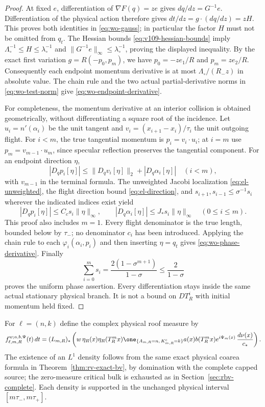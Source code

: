 \begin{proof}
At fixed $e$, differentiation of $\nabla F(q)=ze$ gives
$dq/dz=G^{-1}e$.  Differentiation of the physical action therefore
gives $dt/dz=g\cdot(dq/dz)=zH$.  This proves both identities in
\eqref{eq:wo-gauss}; in particular the factor $H$ must not be
omitted from $q_t$.  The Hessian bounds
\eqref{eq:v109-hessian-bounds} imply
$\Lambda_\circ^{-1}\le H\le\lambda_\circ^{-1}$ and
$\|G^{-1}e\|_\infty\le\lambda_\circ^{-1}$, proving the displayed
inequality.  By the exact first variation
$g=R(-p_0,p_m)$, we have $p_0=-ze_1/R$ and $p_m=ze_2/R$.
Consequently each endpoint momentum derivative is at most
$\Lambda_\circ/(R_-z)$ in absolute value.  The chain rule and the
two actual partial-derivative norms in \eqref{eq:wo-test-norm}
give \eqref{eq:wo-endpoint-derivative}.

For completeness, the momentum derivative at an interior collision
is obtained geometrically, without differentiating a square root
of the incidence.  Let $u_i=n'(\alpha_i)$ be the unit tangent and
$v_i=(x_{i+1}-x_i)/\tau_i$ the unit outgoing flight.  For $i<m$,
the true tangential momentum is $p_i=v_i\cdot u_i$; at $i=m$
use $p_m=v_{m-1}\cdot u_m$, since specular reflection preserves
the tangential component.  For an endpoint direction $\eta$,
\[
 |D_qp_i[\eta]|
 \le \|D_qv_i[\eta]\|_2+|D_q\alpha_i[\eta]|
 \quad(i<m),
\]
with $v_{m-1}$ in the terminal formula.  The unweighted Jacobi
localization \eqref{eq:el-unweighted}, the flight direction bound
\eqref{eq:el-direction}, and
$s_{i+1},s_{i-1}\le\sigma^{-1}s_i$ wherever the indicated
indices exist yield
\begin{equation}\label{eq:wo-interior-momentum}
 |D_qp_i[\eta]|\le C_c s_i\|\eta\|_\infty,
 \qquad |D_q\alpha_i[\eta]|\le J_*s_i\|\eta\|_\infty
 \quad(0\le i\le m).
\end{equation}
This proof also includes $m=1$.  Every flight denominator is the
true length, bounded below by $\tau_-$; no denominator $c_i$
has been introduced.  Applying the chain rule to each
$\varphi_i(\alpha_i,p_i)$ and then inserting $\eta=q_t$ gives
\eqref{eq:wo-phase-derivative}.  Finally
\[
 \sum_{i=0}^m s_i
 =\frac{2(1-\sigma^{m+1})}{1-\sigma}
 \le\frac2{1-\sigma}
\]
proves the uniform phase assertion.  Every differentiation stays
inside the same actual stationary physical branch.  It is not a
bound on $D T_R^i$ with initial momentum held fixed.
\end{proof}

For $\ell=(n,k)$ define the complex physical roof measure by
\begin{equation}\label{eq:wo-measures}
 f^{w;a,b,\Psi}_{\ell,m,R}(t)\,dt
 =(L_{m,R})_*\left(
 w\,\eta_R(x)\eta_R(T_R^mx)
 \one_{\{A_{m,R}=n,\,K^{\rm c}_{m,R}=k\}}
 a(x)b(T_R^mx)e^{i\Psi_m(x)}\,\frac{d\nu(x)}{c_*}
 \right).
\end{equation}
The existence of an $L^1$ density follows from the same exact
physical coarea formula in Theorem~\ref{thm:rv-exact-bv}, by domination with the complete
capped source; the zero-measure critical bulk is exhausted as in Section~\ref{sec:rbv-complete}.
Each density is supported in the unchanged physical interval
$[m\tau_-,m\tau_+]$.

